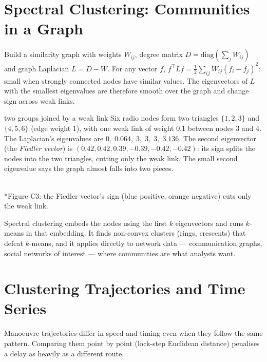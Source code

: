 \documentclass[11pt]{article}
\begin{document}
\section{Spectral Clustering: Communities in a Graph}
Build a similarity graph with weights $W_{ij}$, degree matrix $D=\text{diag}(\sum_jW_{ij})$ and graph Laplacian $L=D-W$. For any vector $f$, $f^\top Lf=\frac12\sum_{ij}W_{ij}(f_i-f_j)^2$: small when strongly connected nodes have similar values. The eigenvectors of $L$ with the smallest eigenvalues are therefore smooth over the graph and change sign across weak links.
\begin{example}{two groups joined by a weak link}
Six radio nodes form two triangles $\{1,2,3\}$ and $\{4,5,6\}$ (edge weight 1), with one weak link of weight 0.1 between nodes 3 and 4. The Laplacian's eigenvalues are $0,\;0.064,\;3,\;3,\;3,\;3.136$. The second eigenvector (the \emph{Fiedler vector}) is $(0.42,0.42,0.39,-0.39,-0.42,-0.42)$: its sign splits the nodes into the two triangles, cutting only the weak link. The small second eigenvalue says the graph almost falls into two pieces.
\end{example}
\begin{center}\\*{\small\color{GreyN}Figure C3: the Fiedler vector's sign (blue positive, orange negative) cuts only the weak link.}\end{center}

Spectral clustering embeds the nodes using the first $k$ eigenvectors and runs $k$-means in that embedding. It finds non-convex clusters (rings, crescents) that defeat $k$-means, and it applies directly to network data --- communication graphs, social networks of interest --- where communities are what analysts want.

\section{Clustering Trajectories and Time Series}
Manoeuvre trajectories differ in speed and timing even when they follow the same pattern. Comparing them point by point (lock-step Euclidean distance) penalises a delay as heavily as a different route.
\end{document}
